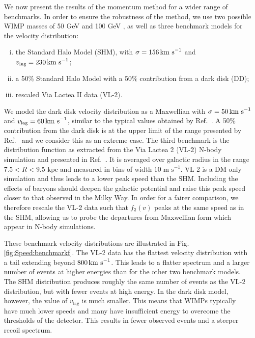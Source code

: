 We now present the results of the momentum method for a wider range of benchmarks. In order to ensure the robustness of the method, we use two possible WIMP masses of 50 GeV and 100 GeV , as well as three benchmark models for the velocity distribution:

\begin{enumerate}[(i)]
\item the Standard Halo Model (SHM), with \(\sigma = 156 \,\textrm{km s}^{-1}\) and \(v_\textrm{lag} = 230 \,\textrm{km s}^{-1}\);
\item a 50\% Standard Halo Model with a 50\% contribution from a dark disk (DD);
\item rescaled Via Lactea II data (VL-2).
\end{enumerate}

We model the dark disk velocity distribution as a Maxwellian with \(\sigma = 50 \,\textrm{km s}^{-1}\) and \(v_\textrm{lag} = 60 \,\textrm{km s}^{-1}\), similar to the typical values obtained by Ref.\ \cite{Purcell:2009}. A 50\% contribution from the dark disk is at the upper limit of the range presented by Ref.\ \cite{DMA55} and we consider this as an extreme case. The third benchmark is the distribution function as extracted from the Via Lactea 2 (VL-2) N-body simulation \cite{Diemand:2008} and presented in Ref.\ \cite{Kuhlen:2010}. It is averaged over galactic radius in the range \(7.5 < R < 9.5 \textrm{ kpc}\) and measured in bins of width \(10 \textrm{ m s}^{-1}\). VL-2 is a DM-only simulation and thus leads to a lower peak speed than the SHM. Including the effects of baryons should deepen the galactic potential and raise this peak speed closer to that observed in the Milky Way. In order for a fairer comparison, we therefore rescale the VL-2 data such that \(f_3(v)\) peaks at the same speed as in the SHM, allowing us to probe the departures from Maxwellian form which appear in N-body simulations.

These benchmark velocity distributions are illustrated in Fig. \ref{fig:Speed:benchmarkf}. The VL-2 data has the flattest velocity distribution with a tail extending beyond \(800 \,\textrm{km s}^{-1}\). This leads to a flatter spectrum and a larger number of events at higher energies than for the other two benchmark models. The SHM distribution produces roughly the same number of events as the VL-2 distribution, but with fewer events at high energy. In the dark disk model, however, the value of \(v_\textrm{lag}\) is much smaller. This means that WIMPs typically have much lower speeds and many have insufficient energy to overcome the thresholds of the detector. This results in fewer observed events and a steeper recoil spectrum.

